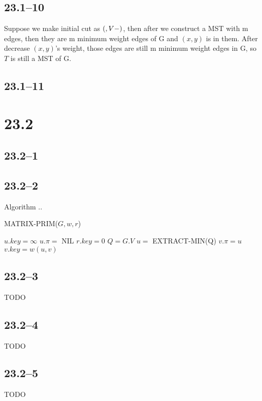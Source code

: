 \documentclass{article}
\begin{document}
\subsection*{23.1--10}
Suppose we make initial cut as $(\empty, V-\empty)$, then after we construct
a MST with m edges, then they are m minimum weight edges of G and $(x, y)$ is
in them. After decrease $(x, y)$'s weight, those edges are still m minimum weight edges in G, so $T$ is still a MST of G.

\subsection*{23.1--11}


\section*{23.2}
\subsection*{23.2--1}

\subsection*{23.2--2}
Algorithm ..
\begin{algorithm}
  \caption{MATRIX-PRIM($G, w, r$)}
  \begin{algorithmic}[1]
    \STATE $u.key = \infty$
    \STATE $u.\pi = $ NIL
    \ENDFOR
    \STATE $r.key = 0$
    \STATE $Q = G.V$
    \STATE $u =$ EXTRACT-MIN(Q)
    \STATE $v.\pi = u$
    \STATE $v.key = w(u, v)$
    \ENDIF
    \ENDFOR
    \ENDWHILE
  \end{algorithmic}
\end{algorithm}

\subsection*{23.2--3}
TODO

\subsection*{23.2--4}
TODO

\subsection*{23.2--5}
TODO
\end{document}

